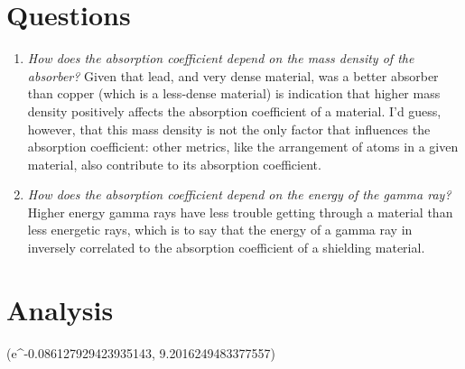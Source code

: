 \documentclass{amsart}
\begin{document}
\section{Questions}

\begin{enumerate}
    \item {\textit{How does the absorption coefficient depend on the mass density of the absorber?}
        Given that lead, and very dense material, was a better absorber than copper (which is a less-dense material) is indication that higher mass density positively affects the absorption coefficient of a material. I'd guess, however, that this mass density is not the only factor that influences the absorption coefficient: other metrics, like the arrangement of atoms in a given material, also contribute to its absorption coefficient.
    }
    \item {\textit{How does the absorption coefficient depend on the energy of the gamma ray?}
        Higher energy gamma rays have less trouble getting through a material than less energetic rays, which is to say that the energy of a gamma ray in inversely correlated to the absorption coefficient of a shielding material.
    }
\end{enumerate}
\section{Analysis}


(e^-0.086127929423935143, 9.2016249483377557)
\end{document}
